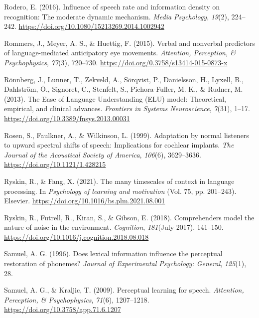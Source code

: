 \documentclass[a4paper, nobind]{templates/ociamthesis}
\newlength{\cslhangindent}
\newenvironment{CSLReferences}[2] %
 {%
  \setlength{\parindent}{0pt}
  \ifodd #1
  \let\oldpar\par
  \def\par{\hangindent=\cslhangindent\oldpar}
  \fi
  \setlength{\parskip}{1mm}
  \setlength{\baselineskip}{6mm}
 }%
 {}
\begin{document}
\begin{CSLReferences}{1}{0}
\leavevmode{}%
Rodero, E. (2016). {Influence of speech rate and information density on recognition: The moderate dynamic mechanism}. \emph{Media Psychology}, \emph{19}(2), 224--242. \url{https://doi.org/10.1080/15213269.2014.1002942}

\leavevmode{}%
Rommers, J., Meyer, A. S., \& Huettig, F. (2015). Verbal and nonverbal predictors of language-mediated anticipatory eye movements. \emph{Attention, Perception, \& Psychophysics}, \emph{77}(3), 720--730. \url{https://doi.org/0.3758/s13414-015-0873-x}

\leavevmode{}%
Rönnberg, J., Lunner, T., Zekveld, A., Sörqvist, P., Danielsson, H., Lyxell, B., Dahlström, Ö., Signoret, C., Stenfelt, S., Pichora-Fuller, M. K., \& Rudner, M. (2013). {The Ease of Language Understanding (ELU) model: Theoretical, empirical, and clinical advances}. \emph{Frontiers in Systems Neuroscience}, \emph{7}(31), 1--17. \url{https://doi.org/10.3389/fnsys.2013.00031}

\leavevmode{}%
Rosen, S., Faulkner, A., \& Wilkinson, L. (1999). Adaptation by normal listeners to upward spectral shifts of speech: Implications for cochlear implants. \emph{The Journal of the Acoustical Society of America}, \emph{106}(6), 3629--3636. \url{https://doi.org/10.1121/1.428215}

\leavevmode{}%
Ryskin, R., \& Fang, X. (2021). The many timescales of context in language processing. In \emph{Psychology of learning and motivation} (Vol. 75, pp. 201--243). Elsevier. \url{https://doi.org/10.1016/bs.plm.2021.08.001}

\leavevmode{}%
Ryskin, R., Futrell, R., Kiran, S., \& Gibson, E. (2018). {Comprehenders model the nature of noise in the environment}. \emph{Cognition}, \emph{181}(July 2017), 141--150. \url{https://doi.org/10.1016/j.cognition.2018.08.018}

\leavevmode{}%
Samuel, A. G. (1996). Does lexical information influence the perceptual restoration of phonemes? \emph{Journal of Experimental Psychology: General}, \emph{125}(1), 28.

\leavevmode{}%
Samuel, A. G., \& Kraljic, T. (2009). Perceptual learning for speech. \emph{Attention, Perception, \& Psychophysics}, \emph{71}(6), 1207--1218. \url{https://doi.org/10.3758/app.71.6.1207}


\end{CSLReferences}
\end{document}
